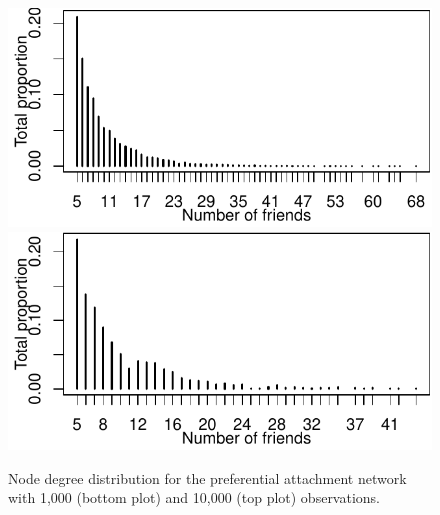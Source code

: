 \documentclass[english]{article}\usepackage[]{graphicx}\usepackage[]{color}
\makeatletter
\def\maxwidth{ %
  \ifdim\Gin@nat@width>\linewidth
    \linewidth
  \else
    \Gin@nat@width
  \fi
}
\newenvironment{knitrout}{}{} %
\theoremstyle{plain}
\theoremstyle{plain}
\makeatother
\begin{document}






\begin{knitrout}\footnotesize
{}\color{fgcolor}\begin{figure}

{\centering \includegraphics[width=\maxwidth]{TablesFigs/knitR-unnamed-chunk-4-1} 
\includegraphics[width=\maxwidth]{TablesFigs/knitR-unnamed-chunk-4-2} 

}

\caption[Node degree distribution for the preferential attachment network with 1,000 (bottom plot) and 10,000 (top plot) observations]{Node degree distribution for the preferential attachment network with 1,000 (bottom plot) and 10,000 (top plot) observations.}\label{fig:unnamed-chunk-4}
\end{figure}


\end{knitrout}
\end{document}
